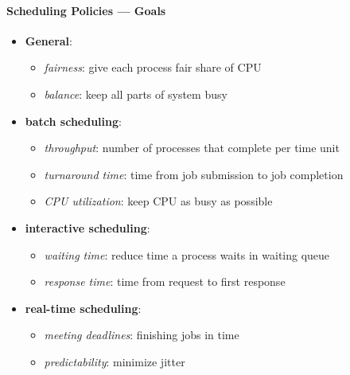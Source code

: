 \paragraph{Scheduling Policies --- Goals}
\begin{itemize}
  \item \textbf{General}:
  \begin{itemize}
    \item \emph{fairness}: give each process fair share of CPU
    \item \emph{balance}: keep all parts of system busy
  \end{itemize}
  \item \textbf{batch scheduling}:
  \begin{itemize}
    \item \emph{throughput}: number of processes that complete per time unit
    \item \emph{turnaround time}: time from job submission to job completion
    \item \emph{CPU utilization}: keep CPU as busy as possible
  \end{itemize}
  \item \textbf{interactive scheduling}:
  \begin{itemize}
    \item \emph{waiting time}: reduce time a process waits in waiting queue
    \item \emph{response time}: time from request to first response
  \end{itemize}
  \item \textbf{real-time scheduling}:
  \begin{itemize}
    \item \emph{meeting deadlines}: finishing jobs in time
    \item \emph{predictability}: minimize jitter
  \end{itemize}
\end{itemize}

